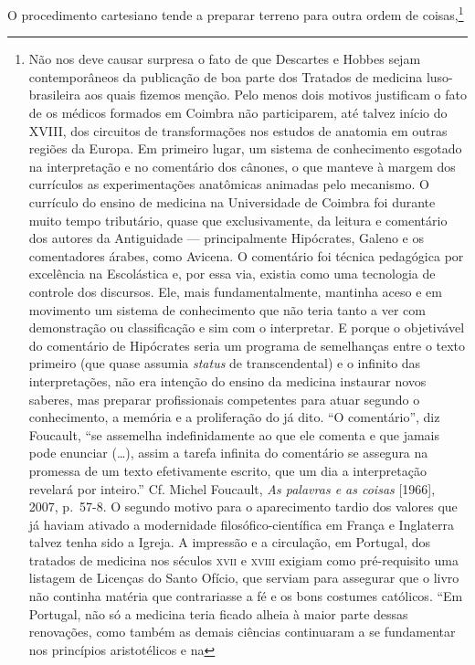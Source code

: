 O procedimento cartesiano tende a preparar terreno para outra ordem de
coisas,\footnote{Não nos deve causar surpresa o fato de que Descartes e
  Hobbes sejam contemporâneos da publicação de boa parte dos Tratados de
  medicina luso-brasileira aos quais fizemos menção. Pelo menos dois
  motivos justificam o fato de os médicos formados em Coimbra não
  participarem, até talvez início do XVIII, dos circuitos de
  transformações nos estudos de anatomia em outras regiões da Europa. Em
  primeiro lugar, um sistema de conhecimento esgotado na interpretação e
  no comentário dos cânones, o que manteve à margem dos currículos as
  experimentações anatômicas animadas pelo mecanismo. O currículo do
  ensino de medicina na Universidade de Coimbra foi durante muito tempo
  tributário, quase que exclusivamente, da leitura e comentário dos
  autores da Antiguidade --- principalmente Hipócrates, Galeno e os
  comentadores árabes, como Avicena. O comentário foi técnica pedagógica
  por excelência na Escolástica e, por essa via, existia como uma
  tecnologia de controle dos discursos. Ele, mais fundamentalmente,
  mantinha aceso e em movimento um sistema de conhecimento que não teria
  tanto a ver com demonstração ou classificação e sim com o interpretar.
  E porque o objetivável do comentário de Hipócrates seria um programa
  de semelhanças entre o texto primeiro (que quase assumia \textit{status}
  de transcendental) e o infinito das interpretações, não era intenção
  do ensino da medicina instaurar novos saberes, mas preparar
  profissionais competentes para atuar segundo o conhecimento, a memória
  e a proliferação do já dito. ``O comentário'', diz Foucault, ``se
  assemelha indefinidamente ao que ele comenta e que jamais pode
  enunciar (\dots{}), assim a tarefa infinita do comentário se assegura na
  promessa de um texto efetivamente escrito, que um dia a interpretação
  revelará por inteiro.'' Cf. Michel Foucault, \textit{As palavras e as
  coisas} {[}1966{]}, 2007, p.~57-8. O segundo motivo para o
  aparecimento tardio dos valores que já haviam ativado a modernidade
  filosófico-científica em França e Inglaterra talvez tenha sido a
  Igreja. A impressão e a circulação, em Portugal, dos tratados de
  medicina nos séculos \textsc{xvii} e \textsc{xviii} exigiam como pré-requisito uma
  listagem de Licenças do Santo Ofício, que serviam para assegurar que o
  livro não continha matéria que contrariasse a fé e os bons costumes
  católicos. ``Em Portugal, não só a medicina teria ficado alheia à
  maior parte dessas renovações, como também as demais ciências
  continuaram a se fundamentar nos princípios aristotélicos e na
}
